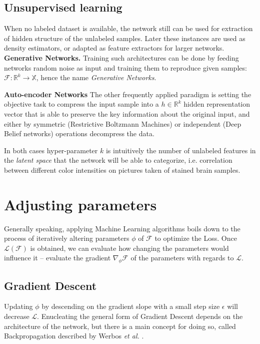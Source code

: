 \subsection{Unsupervised learning}
When no labeled dataset is available, the network still can be used for extraction of hidden structure of the unlabeled samples. Later these instances are used as density estimators, or adapted as feature extractors for larger networks.
\textbf{Generative Networks.} Training such architectures can be done by feeding networks random noise as input and training them to reproduce given samples: $\mathcal{F}:\mathbb{R}^k \rightarrow \mathbb{X}$, hence the name \emph{Generative Networks}.

\textbf{Auto-encoder Networks} The other frequently applied paradigm is setting the objective task to compress the input sample into a $h \in \mathbb{R}^k$ hidden representation vector that is able to preserve the key information about the original input, and either by symmetric (Restrictive Boltzmann Machines) or independent (Deep Belief networks) operations decompress the data.

In both cases hyper-parameter $k$ is intuitively the number of unlabeled features in the \emph{latent space} that the network will be able to categorize, i.e. correlation between different color intensities on pictures taken of stained brain samples.


\section{Adjusting parameters}
Generally speaking, applying Machine Learning algorithms boils down to the process of iteratively altering parameters $\phi$ of $\mathcal{F}$ to optimize the Loss.
Once $\mathcal{L}(\mathcal{F})$ is obtained, we can evaluate how changing the parameters would influence it -- evaluate the gradient $\nabla_\phi \mathcal{F}$ of the parameters  with regards to $\mathcal{L}$.

\subsection{Gradient Descent}
Updating $\phi$ by descending on the gradient slope with a small step size $\epsilon$ will decrease $\mathcal{L}$.
Enucleating the general form of Gradient Descent depends on the architecture of the network, but there is a main concept for doing so, called Backpropagation described by Werbos \emph{et al.} \cite{werbos1994roots}.

